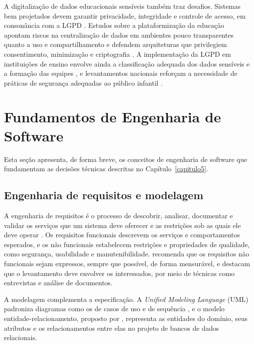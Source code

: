 A digitalização de dados educacionais sensíveis também traz desafios. Sistemas bem projetados devem garantir privacidade, integridade e controle de acesso, em consonância com a LGPD \cite{Silva_Sena_2025}. Estudos sobre a plataformização da educação apontam riscos na centralização de dados em ambientes pouco transparentes quanto a uso e compartilhamento \cite{internetlab2024_plataformizacao} e defendem arquiteturas que privilegiem consentimento, minimização e criptografia \cite{Borba_2025}. A implementação da LGPD em instituições de ensino envolve ainda a classificação adequada dos dados sensíveis e a formação das equipes \cite{candiani2024_lgpd_instituicoes}, e levantamentos nacionais reforçam a necessidade de práticas de segurança adequadas ao público infantil \cite{cetic2024_tic_kids}.

\section{Fundamentos de Engenharia de Software}\label{sec:fundamentos_tecnicos}

Esta seção apresenta, de forma breve, os conceitos de engenharia de software que fundamentam as decisões técnicas descritas no Capítulo~\ref{capitulo5}.

\subsection{Engenharia de requisitos e modelagem}\label{sec:fund_requisitos}

A engenharia de requisitos é o processo de descobrir, analisar, documentar e validar os serviços que um sistema deve oferecer e as restrições sob as quais ele deve operar \cite{sommerville2018_engenharia_software}. Os requisitos funcionais descrevem os serviços e comportamentos esperados, e os não funcionais estabelecem restrições e propriedades de qualidade, como segurança, usabilidade e manutenibilidade.  recomenda que os requisitos não funcionais sejam expressos, sempre que possível, de forma mensurável, e  destacam que o levantamento deve envolver os interessados, por meio de técnicas como entrevistas e análise de documentos.

A modelagem complementa a especificação. A \textit{Unified Modeling Language} (UML) padroniza diagramas como os de casos de uso e de sequência \cite{omg2017_uml}, e o modelo entidade-relacionamento, proposto por , representa as entidades do domínio, seus atributos e os relacionamentos entre elas no projeto de bancos de dados relacionais.


